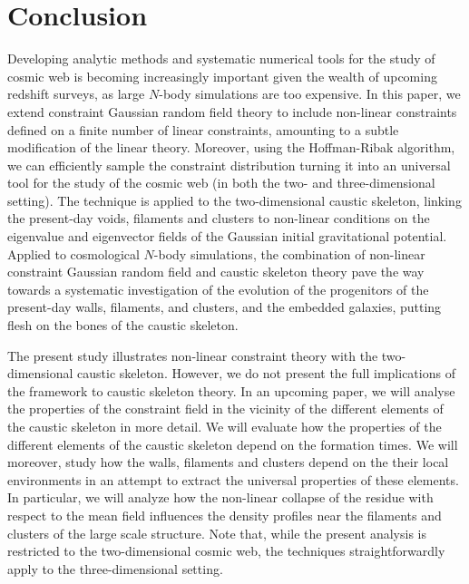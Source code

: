 \documentclass[a4paper, 11pt]{article}
\begin{document}
\section{Conclusion}\label{sec:conclusion}
Developing analytic methods and systematic numerical tools for the study of cosmic web is becoming increasingly important given the wealth of upcoming redshift surveys, as large $N$-body simulations are too expensive. In this paper, we extend constraint Gaussian random field theory to include non-linear constraints defined on a finite number of linear constraints, amounting to a subtle modification of the linear theory. Moreover, using the Hoffman-Ribak algorithm, we can efficiently sample the constraint distribution turning it into an universal tool for the study of the cosmic web (in both the two- and three-dimensional setting). The technique is applied to the two-dimensional caustic skeleton, linking the present-day voids, filaments and clusters to non-linear conditions on the eigenvalue and eigenvector fields of the Gaussian initial gravitational potential. Applied to cosmological $N$-body simulations, the combination of non-linear constraint Gaussian random field and caustic skeleton theory pave the way towards a systematic investigation of the evolution of the progenitors of the present-day walls, filaments, and clusters, and the embedded galaxies, putting flesh on the bones of the caustic skeleton. 

The present study illustrates non-linear constraint theory with the two-dimensional caustic skeleton. However, we do not present the full implications of the framework to caustic skeleton theory. In an upcoming paper, we will analyse the properties of the constraint field in the vicinity of the different elements of the caustic skeleton in more detail. We will evaluate how the properties of the different elements of the caustic skeleton depend on the formation times. We will moreover, study how the walls, filaments and clusters depend on the their local environments in an attempt to extract the universal properties of these elements. In particular, we will analyze how the non-linear collapse of the residue with respect to the mean field influences the density profiles near the filaments and clusters of the large scale structure. Note that, while the present analysis is restricted to the two-dimensional cosmic web, the techniques straightforwardly apply to the three-dimensional setting.

%
\end{document}
